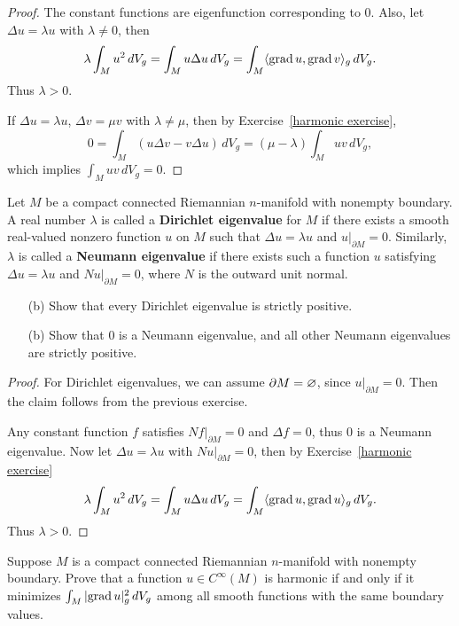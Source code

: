 \begin{proof}
The constant functions are eigenfunction corresponding to $0$. Also, let $\Delta u=\lambda u$ with $\lambda\neq 0$, then
\[\lambda\int_Mu^2\,dV_g=\int_Mu\Delta u\,dV_g=\int_M\langle\mathrm{grad}\, u,\mathrm{grad}\, v\rangle_g\,dV_g.\]
Thus $\lambda>0$.\par
If $\Delta u=\lambda u$, $\Delta v=\mu v$ with $\lambda\neq\mu$, then by Exercise~\ref{harmonic exercise},
\[0=\int_M(u\Delta v-v\Delta u)\,dV_g=(\mu-\lambda)\int_Muv\,dV_g,\]
which implies $\int_Muv\,dV_g=0$.
\end{proof}
\begin{exercise}
Let $M$ be a compact connected Riemannian $n$-manifold with nonempty boundary. A real number $\lambda$ is called a \textbf{Dirichlet eigenvalue} for $M$ if there exists a smooth real-valued nonzero function $u$ on $M$ such that $\Delta u=\lambda u$ and $u|_{\partial M}=0$. Similarly, $\lambda$ is called a \textbf{Neumann eigenvalue} if there exists such a function $u$ satisfying $\Delta u=\lambda u$ and $Nu|_{\partial M}=0$, where $N$ is the outward unit normal.
\begin{itemize}
\item[(b)] Show that every Dirichlet eigenvalue is strictly positive.
\item[(b)] Show that $0$ is a Neumann eigenvalue, and all other Neumann eigenvalues are strictly positive.
\end{itemize}
\end{exercise}
\begin{proof}
For Dirichlet eigenvalues, we can assume $\partial M=\varnothing$, since $u|_{\partial M}=0$. Then the claim follows from the previous exercise.\par
Any constant function $f$ satisfies $Nf|_{\partial M}=0$ and $\Delta f=0$, thus $0$ is a Neumann eigenvalue. Now let $\Delta u=\lambda u$ with $Nu|_{\partial M}=0$, then by Exercise~\ref{harmonic exercise}
\[\lambda\int_M u^2\,dV_g=\int_Mu\Delta u\,dV_g=\int_M\langle\mathrm{grad}\, u,\mathrm{grad}\, u\rangle_g\,dV_g.\]
Thus $\lambda>0$.
\end{proof}
\begin{exercise}
Suppose $M$ is a compact connected Riemannian $n$-manifold with nonempty boundary. Prove that a function $u\in C^\infty(M)$ is harmonic if and only if it minimizes 
$\int_M|\mathrm{grad}\, u|^2_g\,dV_g$ among all smooth functions with the same boundary values.
\end{exercise}
